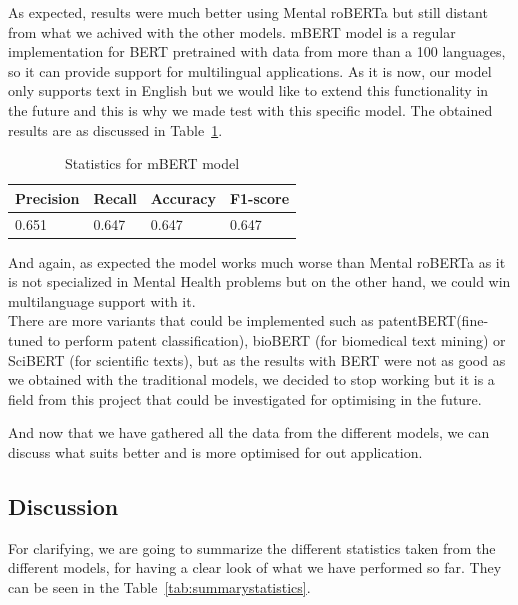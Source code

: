 As expected, results were much better using Mental roBERTa but still distant from what we achived with the other models.
mBERT model is a regular implementation for BERT pretrained with data from more than a 100 languages, so it can provide support for multilingual applications. As it is now, our model only supports text in English but we would like to extend this functionality in the future and this is why we made test with this specific model. The obtained results are as discussed in Table~\ref{tab:mBERTstatistics}.
\begin{table}[!htp]
\centering
\begin{tabular}{|l|l|l|l|}
\hline
Precision & Recall & Accuracy  & F1-score  \\ \hline
0.651      & 0.647 &  0.647    & 0.647 \\ \hline
\end{tabular}
\caption{Statistics for mBERT model}
\label{tab:mBERTstatistics}
\end{table}

And again, as expected the model works much worse than Mental roBERTa as it is not specialized in Mental Health problems but on the other hand, we could win multilanguage support with it. \\

There are more variants that could be implemented such as patentBERT(fine-tuned to perform patent classification), bioBERT (for biomedical text mining) or SciBERT (for scientific texts), but as the results with BERT were not as good as we obtained with the traditional models, we decided to stop working but it is a field from this project that could be investigated for optimising in the future.

And now that we have gathered all the data from the different models, we can discuss what suits better and is more optimised for out application.

\subsection{Discussion}
For clarifying, we are going to summarize the different statistics taken from the different models, for having a clear look of what we have performed so far. They can be seen in the Table~\ref{tab:summarystatistics}.

